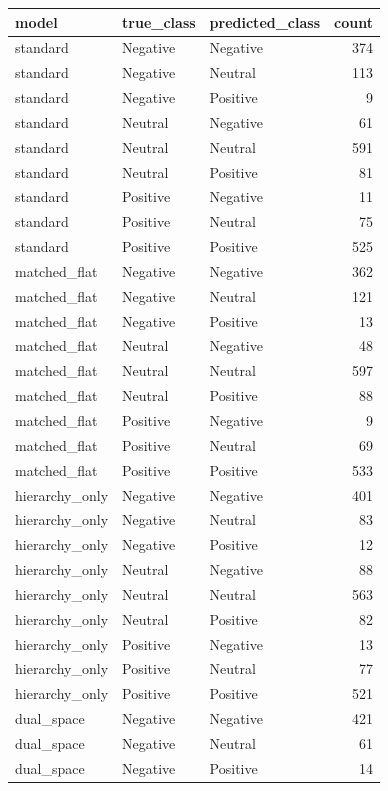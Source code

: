 \begin{tabular}{lllr}
\toprule
model & true\_class & predicted\_class & count \\
\midrule
standard & Negative & Negative & 374 \\
standard & Negative & Neutral & 113 \\
standard & Negative & Positive & 9 \\
standard & Neutral & Negative & 61 \\
standard & Neutral & Neutral & 591 \\
standard & Neutral & Positive & 81 \\
standard & Positive & Negative & 11 \\
standard & Positive & Neutral & 75 \\
standard & Positive & Positive & 525 \\
matched\_flat & Negative & Negative & 362 \\
matched\_flat & Negative & Neutral & 121 \\
matched\_flat & Negative & Positive & 13 \\
matched\_flat & Neutral & Negative & 48 \\
matched\_flat & Neutral & Neutral & 597 \\
matched\_flat & Neutral & Positive & 88 \\
matched\_flat & Positive & Negative & 9 \\
matched\_flat & Positive & Neutral & 69 \\
matched\_flat & Positive & Positive & 533 \\
hierarchy\_only & Negative & Negative & 401 \\
hierarchy\_only & Negative & Neutral & 83 \\
hierarchy\_only & Negative & Positive & 12 \\
hierarchy\_only & Neutral & Negative & 88 \\
hierarchy\_only & Neutral & Neutral & 563 \\
hierarchy\_only & Neutral & Positive & 82 \\
hierarchy\_only & Positive & Negative & 13 \\
hierarchy\_only & Positive & Neutral & 77 \\
hierarchy\_only & Positive & Positive & 521 \\
dual\_space & Negative & Negative & 421 \\
dual\_space & Negative & Neutral & 61 \\
dual\_space & Negative & Positive & 14 \\

\end{tabular}
